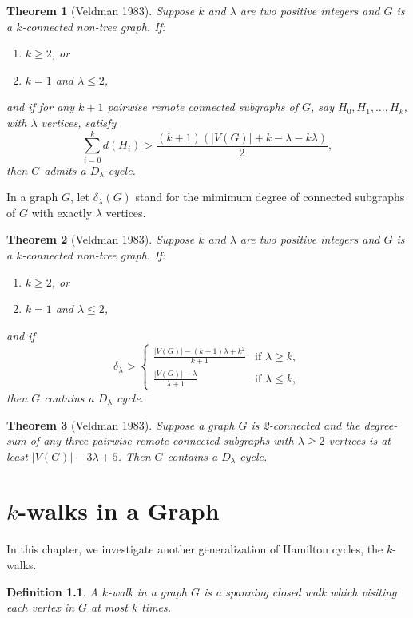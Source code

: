 \documentclass[12pt]{report}
\newtheorem{theorem}{Theorem}
\newtheorem{definition}{Definition}
\begin{document}
\begin{theorem}[Veldman 1983]\label{thm3inveldlamc83}
Suppose $k$ and $\lambda$ are two positive integers and $G$ is a $k$-connected non-tree graph. If:
\begin{enumerate}
\item $k\ge2$, or
\item $k=1$ and $\lambda\le2$,
\end{enumerate}
and if for any $k+1$ pairwise remote connected subgraphs of $G$, say $H_0,H_1,\ldots,H_k$, with $\lambda$ vertices, satisfy $$\sum^k_{i=0}d(H_i)>\frac{(k+1)(|V(G)|+k-\lambda-k\lambda)}{2},$$
then $G$ admits a $D_{\lambda}$-cycle.

\end{theorem}
In a graph $G$, let $\delta_{\lambda}(G)$ stand for the mimimum degree of connected subgraphs of $G$ with exactly $\lambda$ vertices.
\begin{theorem}[Veldman 1983]\label{thm4inveldlamc83}
Suppose $k$ and $\lambda$ are two positive integers and $G$ is a $k$-connected non-tree graph. If:
\begin{enumerate}
\item $k\ge2$, or
\item $k=1$ and $\lambda\le2$,
\end{enumerate}
and if $$\delta_{\lambda}>\left\{\begin{array}{cc}\frac{|V(G)|-(k+1)\lambda+k^2}{k+1}&\text{if }\lambda\ge k,\\ \frac{|V(G)|-\lambda}{\lambda+1}&\text{if }\lambda\le k,\end{array}\right.$$
then $G$ contains a $D_{\lambda}$ cycle.
\end{theorem}

\begin{theorem}[Veldman 1983]\label{thm5inveldlamc83}
Suppose a graph $G$ is 2-connected and the degree-sum of any three pairwise remote connected subgraphs with $\lambda\ge2$ vertices is at least $|V(G)|-3\lambda+5$. Then $G$ contains a $D_{\lambda}$-cycle.

\end{theorem}










\chapter{$k$-walks in a Graph}\label{ch4kw}
In this chapter, we investigate another generalization of Hamilton cycles, the $k$-walks. 
\begin{definition}\label{defkwalk}
A $k$-walk in a graph $G$ is a spanning closed walk which visiting each vertex in $G$ at most $k$ times.
\end{definition}
\end{document}
